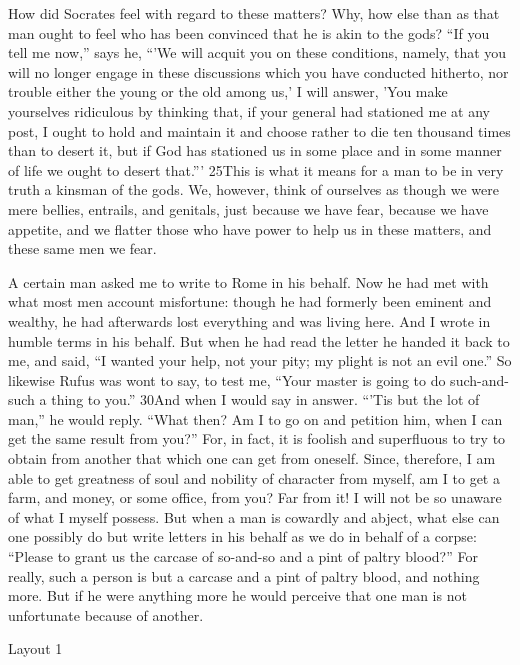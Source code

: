 How did Socrates feel with regard to these matters? Why, how else than as that man ought to feel who has been convinced that he is akin to the gods? ``If you tell me now,'' says he, ``'We will acquit you on these conditions, namely, that you will no longer engage in these discussions which you have conducted hitherto, nor trouble either the young or the old among us,' I will answer, 'You make yourselves ridiculous by thinking that, if your general had stationed me at any post, I ought to hold and maintain it and choose rather to die ten thousand times than to desert it, but if God has stationed us in some place and in some manner of life we ought to desert that.''' 25This is what it means for a man to be in very truth a kinsman of the gods. We, however, think of ourselves as though we were mere bellies, entrails, and genitals, just because we have fear, because we have appetite, and we flatter those who have power to help us in these matters, and these same men we fear.

A certain man asked me to write to Rome in his behalf. Now he had met with what most men account misfortune: though he had formerly been eminent and wealthy, he had afterwards lost everything and was living here. And I wrote in humble terms in his behalf. But when he had read the letter he handed it back to me, and said, ``I wanted your help, not your pity; my plight is not an evil one.'' So likewise Rufus was wont to say, to test me, ``Your master is going to do such-and-such a thing to you.'' 30And when I would say in answer. ``'Tis but the lot of man,'' he would reply. ``What then? Am I to go on and petition him, when I can get the same result from you?'' For, in fact, it is foolish and superfluous to try to obtain from another that which one can get from oneself. Since, therefore, I am able to get greatness of soul and nobility of character from myself, am I to get a farm, and money, or some office, from you? Far from it! I will not be so unaware of what I myself possess. But when a man is cowardly and abject, what else can one possibly do but write letters in his behalf as we do in behalf of a corpse: ``Please to grant us the carcase of so-and-so and a pint of paltry blood?'' For really, such a person is but a carcase and a pint of paltry blood, and nothing more. But if he were anything more he would perceive that one man is not unfortunate because of another.



Layout 1

